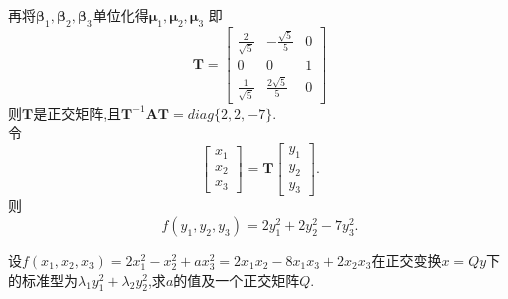 \documentclass[lang=cn,11pt,normal]{elegantbook}
\renewcommand{\AA}{\boldsymbol{A}}
\newcommand{\TT}{\boldsymbol{T}}
\begin{document}
\begin{solution}
		再将$\boldsymbol{\beta}_1,\boldsymbol{\beta}_2,\boldsymbol{\beta}_3$单位化得$\boldsymbol{\mu}_1,\boldsymbol{\mu}_2,\boldsymbol{\mu}_3$
		即
		\begin{equation}
		\TT=
		\begin{bmatrix}
		\frac{2}{\sqrt{5}}&-\frac{\sqrt{5}}{5}&0\\
		0&0&1\\
		\frac{1}{\sqrt{5}}&\frac{2\sqrt{5}}{5}&0
		\end{bmatrix}
		\end{equation}
		则$\TT$是正交矩阵,且$\TT^{-1}\AA\TT=diag\{2,2,-7\}$.\\
		令
		\begin{equation}
		\begin{bmatrix}
		x_1\\x_2\\x_3
		\end{bmatrix}
		=
		\TT
		\begin{bmatrix}
		y_1\\y_2\\y_3
		\end{bmatrix}.
		\end{equation}
		则\\
		\begin{equation}
		f(y_1,y_2,y_3)=2y_1^2+2y_2^2-7y_3^2.
		\end{equation}
		\end{solution}
	\begin{exercise}
		设$f(x_1,x_2,x_3)=2x_1^2-x_2^2+ax_3^2=2x_1x_2-8x_1x_3+2x_2x_3$在正交变换$x=Qy$下的标准型为$\lambda_1y_1^2+\lambda_2y_2^2$,求$a$的值及一个正交矩阵$Q$.
	\end{exercise}
\end{document}
